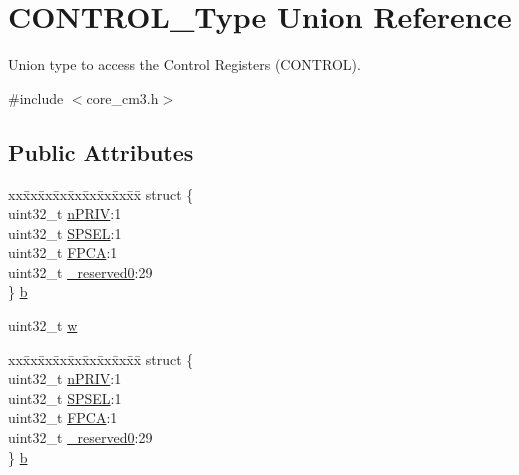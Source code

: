 \hypertarget{union_c_o_n_t_r_o_l___type}{\section{C\-O\-N\-T\-R\-O\-L\-\_\-\-Type Union Reference}
\label{union_c_o_n_t_r_o_l___type}
}


Union type to access the Control Registers (C\-O\-N\-T\-R\-O\-L).  




{\ttfamily \#include $<$core\-\_\-cm3.\-h$>$}

\subsection*{Public Attributes}
\begin{DoxyCompactItemize}
\item 
\begin{tabbing}
xx\=xx\=xx\=xx\=xx\=xx\=xx\=xx\=xx\=\kill
struct \{\\
\>uint32\_t \hyperlink{union_c_o_n_t_r_o_l___type_a35c1732cf153b7b5c4bd321cf1de9605}{nPRIV}:1\\
\>uint32\_t \hyperlink{union_c_o_n_t_r_o_l___type_a8cc085fea1c50a8bd9adea63931ee8e2}{SPSEL}:1\\
\>uint32\_t \hyperlink{union_c_o_n_t_r_o_l___type_ac62cfff08e6f055e0101785bad7094cd}{FPCA}:1\\
\>uint32\_t \hyperlink{union_c_o_n_t_r_o_l___type_af8c314273a1e4970a5671bd7f8184f50}{\_reserved0}:29\\
\} \hyperlink{union_c_o_n_t_r_o_l___type_a383e052776cf878e9b02f5d3a520bef7}{b}\\

\end{tabbing}\item 
uint32\-\_\-t \hyperlink{union_c_o_n_t_r_o_l___type_a6b642cca3d96da660b1198c133ca2a1f}{w}
\item 
\begin{tabbing}
xx\=xx\=xx\=xx\=xx\=xx\=xx\=xx\=xx\=\kill
struct \{\\
\>uint32\_t \hyperlink{union_c_o_n_t_r_o_l___type_a35c1732cf153b7b5c4bd321cf1de9605}{nPRIV}:1\\
\>uint32\_t \hyperlink{union_c_o_n_t_r_o_l___type_a8cc085fea1c50a8bd9adea63931ee8e2}{SPSEL}:1\\
\>uint32\_t \hyperlink{union_c_o_n_t_r_o_l___type_ac62cfff08e6f055e0101785bad7094cd}{FPCA}:1\\
\>uint32\_t \hyperlink{union_c_o_n_t_r_o_l___type_af8c314273a1e4970a5671bd7f8184f50}{\_reserved0}:29\\
\} \hyperlink{union_c_o_n_t_r_o_l___type_aa62abc89b024d8037a1b1ffe596b0d2b}{b}\\

\end{tabbing}\end{DoxyCompactItemize}


